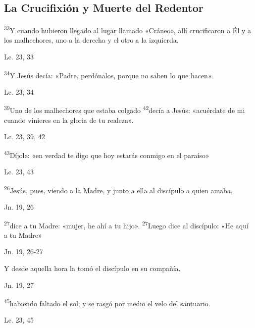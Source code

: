 \documentclass[a4paper,11pt]{article}
\begin{document}
    \subsection*{\hfil La Crucifixión y Muerte del Redentor \hfil}
      
      \textsuperscript{33}Y cuando hubieron llegado al lugar llamado «Cráneo», allí crucificaron a Él y a los malhechores, uno a la derecha y el otro a la izquierda.
      \begin{flushright}
        Lc. 23, 33
      \end{flushright}

      \textsuperscript{34}Y Jesús decía: «Padre, perdónalos, porque no saben lo que hacen».
      \begin{flushright}
        Lc. 23, 34
      \end{flushright}

      \textsuperscript{39}Uno de los malhechores que estaba colgado \textsuperscript{42}decía a Jesús: «acuérdate de mi cuando vinieres en la gloria de tu realeza».
      \begin{flushright}
        Lc. 23, 39, 42
      \end{flushright}

      \textsuperscript{43}Díjole: «en verdad te digo que hoy estarás conmigo en el paraíso»
      \begin{flushright}
        Lc. 23, 43
      \end{flushright}

      \textsuperscript{26}Jesús, pues, viendo a la Madre, y junto a ella al discípulo a quien amaba,
      \begin{flushright}
        Jn. 19, 26
      \end{flushright}

      \textsuperscript{27}dice a tu Madre: «mujer, he ahí a tu hijo». \textsuperscript{27}Luego dice al discípulo: «He aquí a tu Madre»
      \begin{flushright}
        Jn. 19, 26-27
      \end{flushright}

      Y desde aquella hora la tomó el discípulo en su compañía.
      \begin{flushright}
        Jn. 19, 27
      \end{flushright}

      \textsuperscript{45}habiendo faltado el sol; y se rasgó por medio el velo del santuario.
      \begin{flushright}
        Lc. 23, 45
      \end{flushright}
\end{document}
